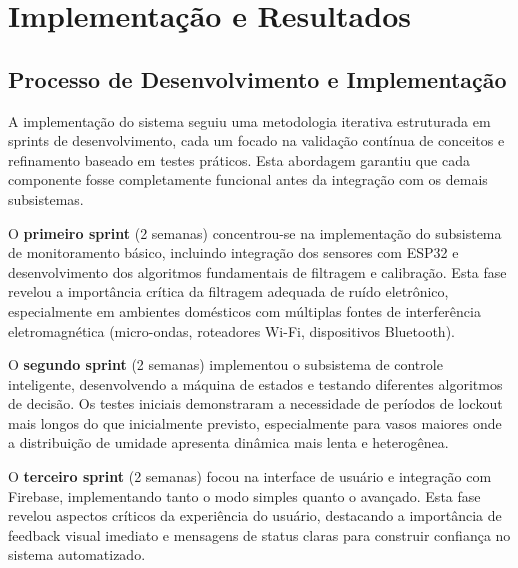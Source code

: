 \documentclass[twoside,english,brazilian]{UNISINOSmonografia}
\begin{document}

\chapter{Implementação e Resultados}

\section{Processo de Desenvolvimento e Implementação}

A implementação do sistema seguiu uma metodologia iterativa estruturada em sprints de desenvolvimento, cada um focado na validação contínua de conceitos e refinamento baseado em testes práticos. Esta abordagem garantiu que cada componente fosse completamente funcional antes da integração com os demais subsistemas.

O \textbf{primeiro sprint} (2 semanas) concentrou-se na implementação do subsistema de monitoramento básico, incluindo integração dos sensores com ESP32 e desenvolvimento dos algoritmos fundamentais de filtragem e calibração. Esta fase revelou a importância crítica da filtragem adequada de ruído eletrônico, especialmente em ambientes domésticos com múltiplas fontes de interferência eletromagnética (micro-ondas, roteadores Wi-Fi, dispositivos Bluetooth).

O \textbf{segundo sprint} (2 semanas) implementou o subsistema de controle inteligente, desenvolvendo a máquina de estados e testando diferentes algoritmos de decisão. Os testes iniciais demonstraram a necessidade de períodos de lockout mais longos do que inicialmente previsto, especialmente para vasos maiores onde a distribuição de umidade apresenta dinâmica mais lenta e heterogênea.

O \textbf{terceiro sprint} (2 semanas) focou na interface de usuário e integração com Firebase, implementando tanto o modo simples quanto o avançado. Esta fase revelou aspectos críticos da experiência do usuário, destacando a importância de feedback visual imediato e mensagens de status claras para construir confiança no sistema automatizado.
\end{document}
